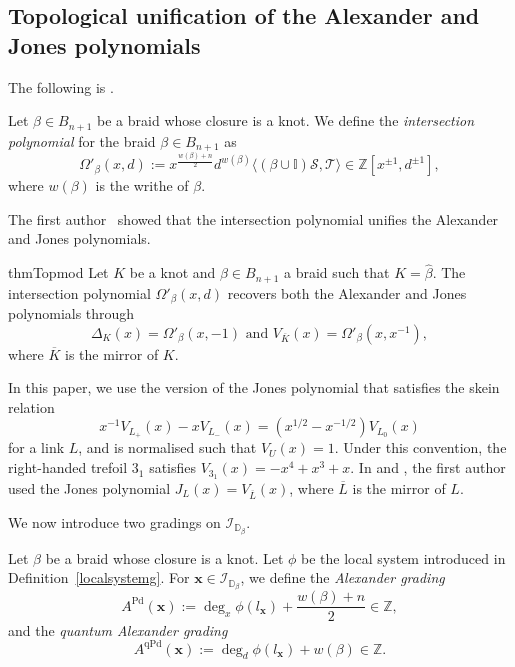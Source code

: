 \documentclass[11pt]{amsart}
\numberwithin{equation}{section}
\numberwithin{figure}{section}
\theoremstyle{definition}
\newcommand{\cI}{\mathcal{I}}
\newcommand{\cs}{\mathscr{S}}
\newcommand{\ct}{\mathscr{T}}
\newcommand{\bD}{\mathbb{D}}
\newcommand{\bZ}{\mathbb{Z}}
\newcommand{\mK}{\overline{K}}
\DeclareMathOperator{\Pd}{Pd}
\DeclareMathOperator{\qPd}{qPd}
\newcommand{\xs}{\boldsymbol{x}}
\begin{document}
\subsection{Topological unification of the Alexander and Jones polynomials}

The following is \cite[Definition~3.10]{Anghel2024AIF}.

\begin{defn}\label{defn} Let $\beta \in B_{n+1}$ be a braid whose closure is a knot. We define the \emph{intersection polynomial} for the braid $\beta \in B_{n+1}$ as 
\begin{equation}
\Omega'_\beta(x,d):= x^{\frac{w(\beta)+n}{2}} d^{w(\beta)} \langle  (\beta \cup \mathbb I) \cs, \ct \rangle \in \bZ[x^{\pm 1}, d^{\pm 1}], 
\end{equation}
where $w(\beta)$ is the writhe of $\beta$. 
\end{defn}

The first author~\cite{Anghel2024AIF} showed that the intersection polynomial unifies the Alexander and Jones polynomials.

\begin{restatable}{thm}{Topmod}\label{Topmod} Let $K$ be a knot and $\beta \in B_{n+1}$ a braid such that $K = \hat{\beta}$. The intersection polynomial $\Omega'_\beta(x,d)$ recovers both the Alexander and Jones polynomials through
\begin{equation*}
{\Delta_K(x)} = \Omega'_\beta(x,-1) \text{ and }
{V_{\mK}(x)} = \Omega'_\beta(x,x^{-1}),
\end{equation*}
where $\mK$ is the mirror of $K$.
\end{restatable}

\begin{rmk}\label{rmk:Jones-convention}
In this paper, we use the version of the Jones polynomial that satisfies the skein relation
\[
x^{-1} V_{L_+}(x) - xV_{L_-}(x) = (x^{1/2} - x^{-1/2}) V_{L_0}(x)
\]
for a link $L$, and is normalised such that $V_U(x)=1$. Under this convention, the right-handed trefoil $3_1$ satisfies $V_{3_1}(x) = -x^4+x^3+x$. In \cite{Anghel2023TAMS} and \cite{Anghel2024AIF}, the first author used the Jones polynomial $J_L(x) = V_{\overline{L}}(x)$, where $\overline{L}$ is the mirror of $L$.
\end{rmk}

We now introduce two gradings on $\cI_{\bD_\beta}$.

\begin{defn}\label{def:grdisc''} 
Let $\beta$ be a braid whose closure is a knot. Let $\phi$ be the local system introduced in Definition~\ref{localsystemg}. For $\xs \in \cI_{\bD_\beta}$, we define the \emph{Alexander grading}
\begin{equation}
A^{\Pd}(\xs) := \deg_x \phi(l_{\xs}) + \frac{w(\beta)+n}{2} \in \bZ,
\end{equation}
and the \emph{quantum Alexander grading}
\begin{equation}
A^{\qPd}(\xs) := \deg_d \phi(l_{\xs}) + w(\beta) \in \bZ.
\end{equation}
\end{defn}
\end{document}

